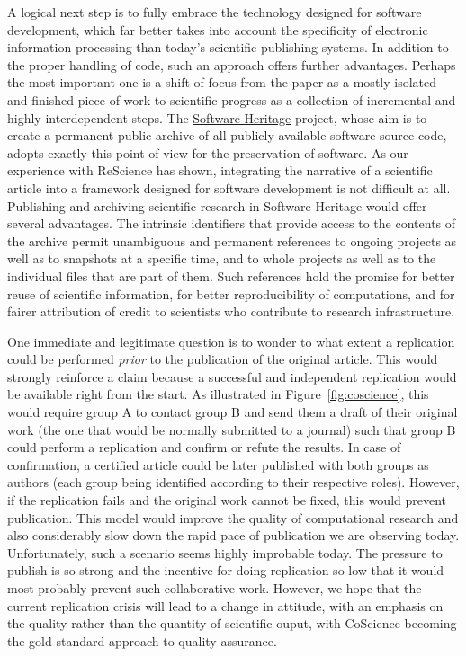 \documentclass[11pt]{article}
\begin{document}
A logical next step is to fully embrace the technology designed for
software development, which far better takes into account the
specificity of electronic information processing than today's
scientific publishing systems. In addition to the proper handling of
code, such an approach offers further advantages. Perhaps the most
important one is a shift of focus from the paper as a mostly isolated
and finished piece of work to scientific progress as a collection of
incremental and highly interdependent steps. The
\href{https://www.softwareheritage.org/}{Software Heritage} project,
whose aim is to create a permanent public archive of all publicly
available software source code, adopts exactly this point of view for
the preservation of software. As our experience with ReScience has
shown, integrating the narrative of a scientific article into a
framework designed for software development is not difficult at all.
Publishing and archiving scientific research in Software Heritage
would offer several advantages. The intrinsic identifiers that provide
access to the contents of the archive permit unambiguous and permanent
references to ongoing projects as well as to snapshots at a specific
time, and to whole projects as well as to the individual files that
are part of them. Such references hold the promise for better reuse of
scientific information, for better reproducibility of
computations, and for fairer attribution of credit to scientists
who contribute to research infrastructure.


One immediate and legitimate question is to wonder to what extent a
replication could be performed \textit{prior} to the publication of
the original article. This would strongly reinforce a claim because a
successful and independent replication would be available right from
the start. As illustrated in Figure~\ref{fig:coscience}, this would
require group A to contact group B and send them a draft of
their original work (the one that would be normally submitted to a
journal) such that group B could perform a replication and confirm or
refute the results. In case of confirmation, a certified article could
be later published with both groups as authors (each group being
identified according to their respective roles). However, if the
replication fails and the original work cannot be fixed, this would
prevent publication. This model would improve the quality of
computational research and also considerably slow down the rapid pace
of publication we are observing today. Unfortunately, such a scenario
seems highly improbable today. The pressure to publish is so strong
and the incentive for doing replication so low that it would most
probably prevent such collaborative work. However, we hope that the
current replication crisis will lead to a change in attitude, with
an emphasis on the quality rather than the quantity of scientific ouput,
with CoScience becoming the gold-standard approach to quality assurance.





\end{document}

